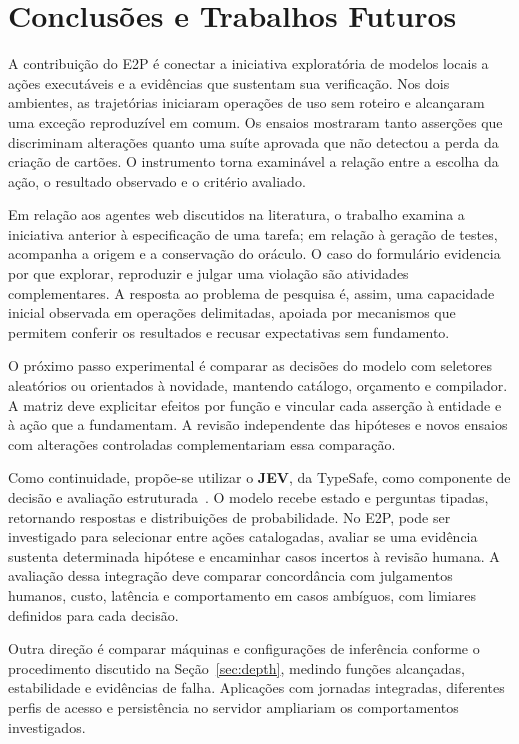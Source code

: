 \documentclass[12pt]{article}
\begin{document}
\section{Conclusões e Trabalhos Futuros}\label{sec:conclusion}
A contribuição do E2P é conectar a iniciativa exploratória de modelos locais a ações executáveis e a evidências que sustentam sua verificação. Nos dois ambientes, as trajetórias iniciaram operações de uso sem roteiro e alcançaram uma exceção reproduzível em comum. Os ensaios mostraram tanto asserções que discriminam alterações quanto uma suíte aprovada que não detectou a perda da criação de cartões. O instrumento torna examinável a relação entre a escolha da ação, o resultado observado e o critério avaliado.

Em relação aos agentes web discutidos na literatura, o trabalho examina a iniciativa anterior à especificação de uma tarefa; em relação à geração de testes, acompanha a origem e a conservação do oráculo. O caso do formulário evidencia por que explorar, reproduzir e julgar uma violação são atividades complementares. A resposta ao problema de pesquisa é, assim, uma capacidade inicial observada em operações delimitadas, apoiada por mecanismos que permitem conferir os resultados e recusar expectativas sem fundamento.

O próximo passo experimental é comparar as decisões do modelo com seletores aleatórios ou orientados à novidade, mantendo catálogo, orçamento e compilador. A matriz deve explicitar efeitos por função e vincular cada asserção à entidade e à ação que a fundamentam. A revisão independente das hipóteses e novos ensaios com alterações controladas complementariam essa comparação.

Como continuidade, propõe-se utilizar o \textbf{JEV}, da TypeSafe, como componente de decisão e avaliação estruturada~\cite{typesafe2026jev}. O modelo recebe estado e perguntas tipadas, retornando respostas e distribuições de probabilidade. No E2P, pode ser investigado para selecionar entre ações catalogadas, avaliar se uma evidência sustenta determinada hipótese e encaminhar casos incertos à revisão humana. A avaliação dessa integração deve comparar concordância com julgamentos humanos, custo, latência e comportamento em casos ambíguos, com limiares definidos para cada decisão.

Outra direção é comparar máquinas e configurações de inferência conforme o procedimento discutido na Seção~\ref{sec:depth}, medindo funções alcançadas, estabilidade e evidências de falha. Aplicações com jornadas integradas, diferentes perfis de acesso e persistência no servidor ampliariam os comportamentos investigados.
\end{document}
